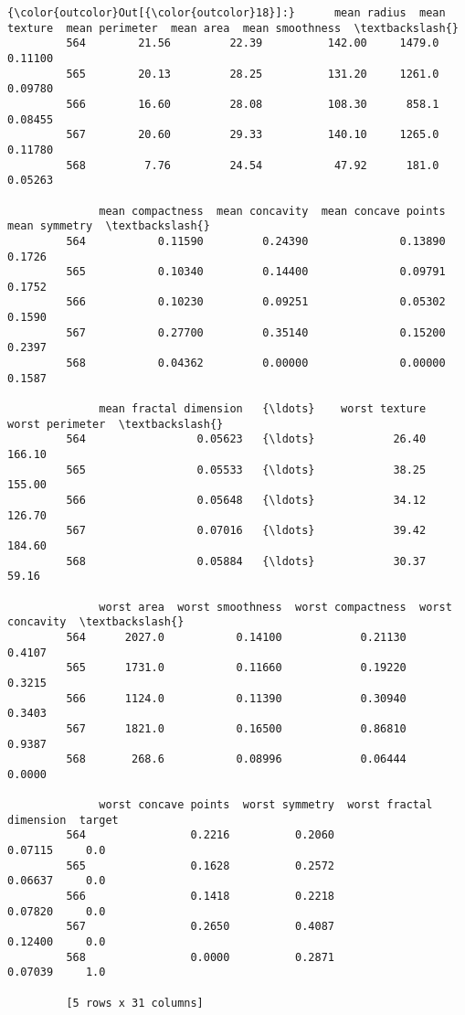 \documentclass[11pt]{article}
\begin{document}
\begin{Verbatim}[commandchars=\\\{\}]
{\color{outcolor}Out[{\color{outcolor}18}]:}      mean radius  mean texture  mean perimeter  mean area  mean smoothness  \textbackslash{}
         564        21.56         22.39          142.00     1479.0          0.11100   
         565        20.13         28.25          131.20     1261.0          0.09780   
         566        16.60         28.08          108.30      858.1          0.08455   
         567        20.60         29.33          140.10     1265.0          0.11780   
         568         7.76         24.54           47.92      181.0          0.05263   
         
              mean compactness  mean concavity  mean concave points  mean symmetry  \textbackslash{}
         564           0.11590         0.24390              0.13890         0.1726   
         565           0.10340         0.14400              0.09791         0.1752   
         566           0.10230         0.09251              0.05302         0.1590   
         567           0.27700         0.35140              0.15200         0.2397   
         568           0.04362         0.00000              0.00000         0.1587   
         
              mean fractal dimension   {\ldots}    worst texture  worst perimeter  \textbackslash{}
         564                 0.05623   {\ldots}            26.40           166.10   
         565                 0.05533   {\ldots}            38.25           155.00   
         566                 0.05648   {\ldots}            34.12           126.70   
         567                 0.07016   {\ldots}            39.42           184.60   
         568                 0.05884   {\ldots}            30.37            59.16   
         
              worst area  worst smoothness  worst compactness  worst concavity  \textbackslash{}
         564      2027.0           0.14100            0.21130           0.4107   
         565      1731.0           0.11660            0.19220           0.3215   
         566      1124.0           0.11390            0.30940           0.3403   
         567      1821.0           0.16500            0.86810           0.9387   
         568       268.6           0.08996            0.06444           0.0000   
         
              worst concave points  worst symmetry  worst fractal dimension  target  
         564                0.2216          0.2060                  0.07115     0.0  
         565                0.1628          0.2572                  0.06637     0.0  
         566                0.1418          0.2218                  0.07820     0.0  
         567                0.2650          0.4087                  0.12400     0.0  
         568                0.0000          0.2871                  0.07039     1.0  
         
         [5 rows x 31 columns]
\end{Verbatim}
            
\end{document}

